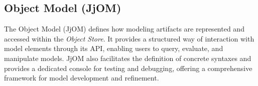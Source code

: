 \begin{comment}
Users can edit the abstract syntax using the \jjodel{} Default Syntax (JjDS), a diagrammatic notation inspired by UML class and object diagrams that adheres to the EMF Ecore~\cite{steinberg2008emf} standard. This approach combines user familiarity with the flexibility required for precise and efficient metamodel definitions.

Additionally, the user interface is designed to support real-time collaboration, allowing multiple users to work concurrently on shared projects, with changes instantly reflected across all sessions. Together, these features create an environment that prioritizes accessibility, efficiency, and collaboration for a wide range of modeling tasks.
%
Both the metamodel and its instantiated models can be explored through the corresponding \textit{Tree-View panel}, where classes, attributes, references, and other model elements are hierarchically organized to emphasize their structural and relational aspects. The \textit{Viewpoints panel} complements this by offering customized visualizations and validations tailored to specific viewpoints, allowing users to flexibly analyze and refine their models within the \jjodel{} environment.

\begin{figure}
    \centering
    \texttt{[image: figs/dashboard.png]}
    \caption{\jjodel{} dashboard.}
    \label{fig:dashboard}
\end{figure}
\end{comment}

\subsection{\jjodel{} Object Model (JjOM)}\label{sec:jom-api}
%
The \jjodel{} Object Model (JjOM) defines how modeling artifacts are represented and accessed within the \textit{\jjodel{} Object Store}. It provides a structured way of interaction with model elements through its API, enabling users to query, evaluate, and manipulate models. JjOM also facilitates the definition of concrete syntaxes and provides a dedicated console for testing and debugging, offering a comprehensive framework for model development and refinement.

